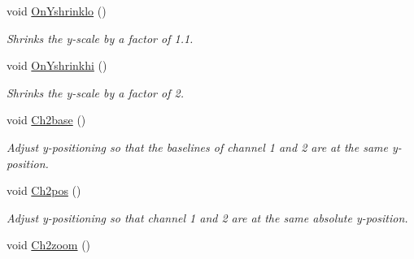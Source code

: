 \begin{DoxyCompactItemize}
void \hyperlink{classwxStfGraph_ae799f0c3a1160c46f31b311b6b9151ff}{OnYshrinklo} ()
\begin{DoxyCompactList}\small\item\em Shrinks the y-\/scale by a factor of 1.1. \item\end{DoxyCompactList}\item 
void \hyperlink{classwxStfGraph_a99cddff62f64fe497b268d8360ad7ed0}{OnYshrinkhi} ()
\begin{DoxyCompactList}\small\item\em Shrinks the y-\/scale by a factor of 2. \item\end{DoxyCompactList}\item 
\hypertarget{classwxStfGraph_a86c1e7b4a43b2a21287cc74f8ce446d4}{
void \hyperlink{classwxStfGraph_a86c1e7b4a43b2a21287cc74f8ce446d4}{Ch2base} ()}
\label{classwxStfGraph_a86c1e7b4a43b2a21287cc74f8ce446d4}

\begin{DoxyCompactList}\small\item\em Adjust y-\/positioning so that the baselines of channel 1 and 2 are at the same y-\/position. \item\end{DoxyCompactList}\item 
\hypertarget{classwxStfGraph_a37dcb75b857298fa5b7a331e239f78f4}{
void \hyperlink{classwxStfGraph_a37dcb75b857298fa5b7a331e239f78f4}{Ch2pos} ()}
\label{classwxStfGraph_a37dcb75b857298fa5b7a331e239f78f4}

\begin{DoxyCompactList}\small\item\em Adjust y-\/positioning so that channel 1 and 2 are at the same absolute y-\/position. \item\end{DoxyCompactList}\item 
\hypertarget{classwxStfGraph_a4dc6f001a2fdda3d33df44ddbd4511fe}{
void \hyperlink{classwxStfGraph_a4dc6f001a2fdda3d33df44ddbd4511fe}{Ch2zoom} ()}
\label{classwxStfGraph_a4dc6f001a2fdda3d33df44ddbd4511fe}


\end{DoxyCompactItemize}
